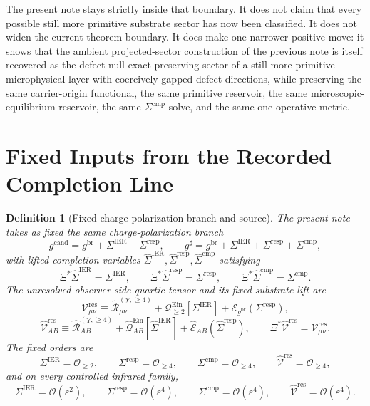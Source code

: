 \documentclass[11pt]{article}
\newcommand{\ObserverMap}{\Xi}
\newcommand{\ObserverMetric}{g^{\mathrm{br}}}
\newcommand{\CandidateMetric}{g^{\mathrm{cand}}}
\newcommand{\CompletedMetric}{g^{\sharp}}
\newcommand{\BaseShift}{\Sigma^{\mathrm{IER}}}
\newcommand{\ResponseShift}{\Sigma^{\mathrm{resp}}}
\newcommand{\CompShift}{\Sigma^{\mathrm{cmp}}}
\newcommand{\BaseLift}{\widehat\Sigma^{\mathrm{IER}}}
\newcommand{\ResponseLift}{\widehat\Sigma^{\mathrm{resp}}}
\newcommand{\CompLift}{\widehat\Sigma^{\mathrm{cmp}}}
\newcommand{\ReLongFour}{\widetilde{\mathcal R}_{\mu\nu}^{(\chi,\ge 4)}}
\newcommand{\ResidualCore}{\mathcal V_{\mu\nu}^{\mathrm{res}}}
\newcommand{\ResidualLift}{\widehat{\mathcal V}^{\mathrm{res}}}
\newcommand{\EinLin}{\mathcal E_{\ObserverMetric}}
\newcommand{\EinQuad}{\mathcal Q_{\ge 2}^{\mathrm{Ein}}}
\newcommand{\epsIR}{\varepsilon}
\newtheorem{definition}{Definition}
\begin{document}
The present note stays strictly inside that boundary. It does not claim that every possible still more primitive substrate sector has now been classified. It does not widen the current theorem boundary. It does make one narrower positive move: it shows that the ambient projected-sector construction of the previous note is itself recovered as the defect-null exact-preserving sector of a still more primitive microphysical layer with coercively gapped defect directions, while preserving the same carrier-origin functional, the same primitive reservoir, the same microscopic-equilibrium reservoir, the same \(\Sigma^{\mathrm{cmp}}\) solve, and the same one operative metric.

\section{Fixed Inputs from the Recorded Completion Line}

\begin{definition}[Fixed charge-polarization branch and source]
\label{def:fixed}
The present note takes as fixed the same charge-polarization branch
\begin{equation}
\CandidateMetric
=
\ObserverMetric+\BaseShift+\ResponseShift,
\qquad
\CompletedMetric
=
\ObserverMetric+\BaseShift+\ResponseShift+\CompShift,
\label{eq:metrics}
\end{equation}
with lifted completion variables \(\BaseLift,\ResponseLift,\CompLift\) satisfying
\begin{equation}
\ObserverMap^*\BaseLift=\BaseShift,
\qquad
\ObserverMap^*\ResponseLift=\ResponseShift,
\qquad
\ObserverMap^*\CompLift=\CompShift.
\label{eq:lifts}
\end{equation}
The unresolved observer-side quartic tensor and its fixed substrate lift are
\begin{equation}
\ResidualCore
\equiv
\ReLongFour
+\EinQuad[\BaseShift]
+\EinLin(\ResponseShift),
\label{eq:vres}
\end{equation}
\begin{equation}
\ResidualLift_{AB}
\equiv
\widehat{\mathcal R}_{AB}^{(\chi,\ge 4)}
+\widehat{\mathcal Q}_{AB}^{\mathrm{Ein}}[\BaseLift]
+\widehat{\mathcal E}_{AB}(\ResponseLift),
\qquad
\ObserverMap^*\ResidualLift=\ResidualCore.
\label{eq:liftedsource}
\end{equation}
The fixed orders are
\begin{equation}
\BaseShift=\mathcal O_{\ge 2},
\qquad
\ResponseShift=\mathcal O_{\ge 4},
\qquad
\CompShift=\mathcal O_{\ge 4},
\qquad
\ResidualLift=\mathcal O_{\ge 4},
\label{eq:orders}
\end{equation}
and on every controlled infrared family,
\begin{equation}
\BaseShift=\mathcal O(\epsIR^2),
\qquad
\ResponseShift=\mathcal O(\epsIR^4),
\qquad
\CompShift=\mathcal O(\epsIR^4),
\qquad
\ResidualLift=\mathcal O(\epsIR^4).
\label{eq:irorders}
\end{equation}
\end{definition}
\end{document}
